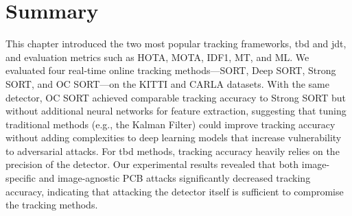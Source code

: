 \clearpage

\section{Summary}

This chapter introduced the two most popular tracking frameworks, \acrfull{tbd} and \acrfull{jdt}, and evaluation metrics such as HOTA, MOTA, IDF1, MT, and ML. We evaluated four real-time online tracking methods—SORT, Deep SORT, Strong SORT, and OC SORT—on the KITTI and CARLA datasets. With the same detector, OC SORT achieved comparable tracking accuracy to Strong SORT but without additional neural networks for feature extraction, suggesting that tuning traditional methods (e.g., the Kalman Filter) could improve tracking accuracy without adding complexities to deep learning models that increase vulnerability to adversarial attacks. For \acrshort{tbd} methods, tracking accuracy heavily relies on the precision of the detector. Our experimental results revealed that both image-specific and image-agnostic PCB attacks significantly decreased tracking accuracy, indicating that attacking the detector itself is sufficient to compromise the tracking methods.
